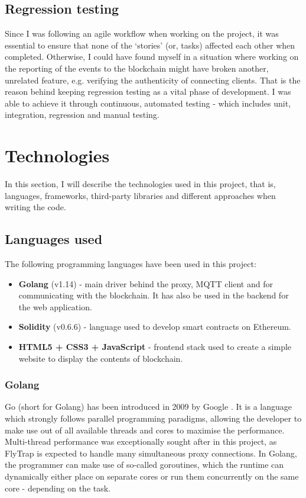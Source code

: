 \subsection{Regression testing}

Since I was following an agile workflow when working on the project, it was essential to ensure that none of the `stories' (or, tasks) affected each other when completed. Otherwise, I could have found myself in a situation where working on the reporting of the events to the blockchain might have broken another, unrelated feature, e.g. verifying the authenticity of connecting clients. That is the reason behind keeping regression testing as a vital phase of development. I was able to achieve it through continuous, automated testing - which includes unit, integration, regression and manual testing.

\section{Technologies}

In this section, I will describe the technologies used in this project, that is, languages, frameworks, third-party libraries and different approaches when writing the code.

\subsection{Languages used}

The following programming languages have been used in this project:
\begin{itemize}
 \item \textbf{Golang} (v1.14) - main driver behind the proxy, MQTT client and for communicating with the blockchain. It has also be used in the backend for the web application.
 \item \textbf{Solidity} (v0.6.6) - language used to develop smart contracts on Ethereum.
 \item \textbf{HTML5 + CSS3 + JavaScript} - frontend stack used to create a simple website to display the contents of blockchain.
\end{itemize}

\subsubsection{Golang}
Go (short for Golang) has been introduced in 2009 by Google \cite{team2009go}. It is a language which strongly follows parallel programming paradigms, allowing the developer to make use out of all available threads and cores to maximise the performance. Multi-thread performance was exceptionally sought after in this project, as FlyTrap is expected to handle many simultaneous proxy connections. In Golang, the programmer can make use of so-called goroutines, which the runtime can dynamically either place on separate cores or run them concurrently on the same core - depending on the task.

